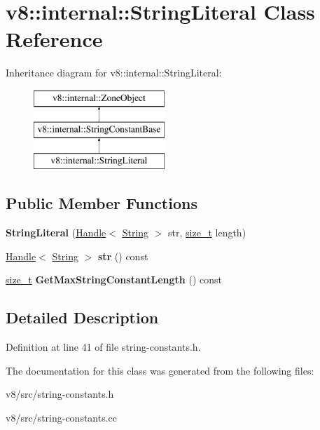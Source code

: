 \hypertarget{classv8_1_1internal_1_1StringLiteral}{}\section{v8\+:\+:internal\+:\+:String\+Literal Class Reference}
\label{classv8_1_1internal_1_1StringLiteral}
Inheritance diagram for v8\+:\+:internal\+:\+:String\+Literal\+:\begin{figure}[H]
\begin{center}
\leavevmode
\includegraphics[height=3.000000cm]{classv8_1_1internal_1_1StringLiteral}
\end{center}
\end{figure}
\subsection*{Public Member Functions}
\begin{DoxyCompactItemize}
\item 
\mbox{\label{classv8_1_1internal_1_1StringLiteral_a17d79adb032f72c07736c4758126ca97}} 
{\bfseries String\+Literal} (\mbox{\hyperlink{classv8_1_1internal_1_1Handle}{Handle}}$<$ \mbox{\hyperlink{classv8_1_1internal_1_1String}{String}} $>$ str, \mbox{\hyperlink{classsize__t}{size\+\_\+t}} length)
\item 
\mbox{\label{classv8_1_1internal_1_1StringLiteral_ac3e8cb611ad5b30540dca7c5f3924f4f}} 
\mbox{\hyperlink{classv8_1_1internal_1_1Handle}{Handle}}$<$ \mbox{\hyperlink{classv8_1_1internal_1_1String}{String}} $>$ {\bfseries str} () const
\item 
\mbox{\label{classv8_1_1internal_1_1StringLiteral_ae2fa17c584fe274326204c3a4f44d45b}} 
\mbox{\hyperlink{classsize__t}{size\+\_\+t}} {\bfseries Get\+Max\+String\+Constant\+Length} () const
\end{DoxyCompactItemize}


\subsection{Detailed Description}


Definition at line 41 of file string-\/constants.\+h.



The documentation for this class was generated from the following files\+:\begin{DoxyCompactItemize}
\item 
v8/src/string-\/constants.\+h\item 
v8/src/string-\/constants.\+cc\end{DoxyCompactItemize}
